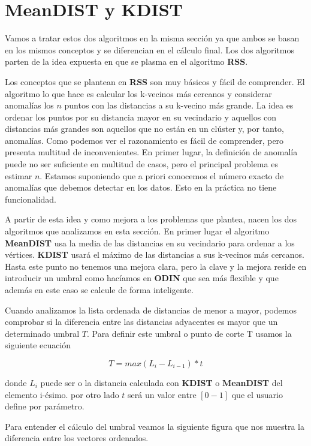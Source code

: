 \section{MeanDIST y KDIST}
Vamos a tratar estos dos algoritmos en la misma sección ya que ambos se basan en
los mismos conceptos y se diferencian en el cálculo final. Los dos algoritmos parten 
de la idea expuesta en \cite{ramaswamyEfficientAlgorithmsMining2000} que se plasma 
en el algoritmo \textbf{RSS}.

Los conceptos que se plantean en \textbf{RSS} son muy básicos y fácil de comprender.
El algoritmo lo que hace es calcular los k-vecinos más cercanos y considerar anomalías
los $n$ puntos con las distancias a su k-vecino más grande. La idea es ordenar los puntos
por su distancia mayor en su vecindario y aquellos con distancias más grandes son aquellos
que no están en un clúster y, por tanto, anomalías. Como podemos ver el razonamiento es
fácil de comprender, pero presenta multitud de inconvenientes. En primer lugar, la definición
de anomalía puede no ser suficiente en multitud de casos, pero el principal problema 
es estimar $n$. Estamos suponiendo que a priori conocemos el número exacto de anomalías
que debemos detectar en los datos. Esto en la práctica no tiene funcionalidad.

A partir de esta idea y como mejora a los problemas que plantea, nacen los dos algoritmos
que analizamos en esta sección. En primer lugar el algoritmo \textbf{MeanDIST} usa
la media de las distancias en su vecindario para ordenar a los vértices. \textbf{KDIST} 
usará el máximo de las distancias a sus k-vecinos más cercanos. Hasta este punto no  
tenemos una mejora clara, pero la clave y la mejora reside en introducir un umbral como 
hacíamos en \textbf{ODIN} que sea más flexible y que además en este caso se calcule  
de forma inteligente.

Cuando analizamos la lista ordenada de distancias de menor a mayor, podemos comprobar
si la diferencia entre las distancias adyacentes es mayor que un determinado umbral $T$.
Para definir este umbral o punto de corte T usamos la siguiente ecuación

\[ T = max(L_i - L_{i-1}) * t \]

donde $L_i$ puede ser o la distancia calculada con \textbf{KDIST} o \textbf{MeanDIST}
del elemento i-ésimo. por otro lado $t$ será un valor entre $[0-1]$ que el usuario define 
por parámetro.

Para entender el cálculo del umbral veamos la siguiente figura que nos muestra la diferencia
entre los vectores ordenados.


